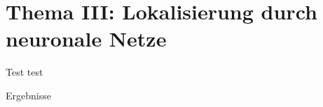 \section{Thema III: Lokalisierung durch neuronale Netze}

\begin{frame}{Test}
    test
\end{frame}

\begin{frame}{Ergebnisse}
    
\end{frame}
